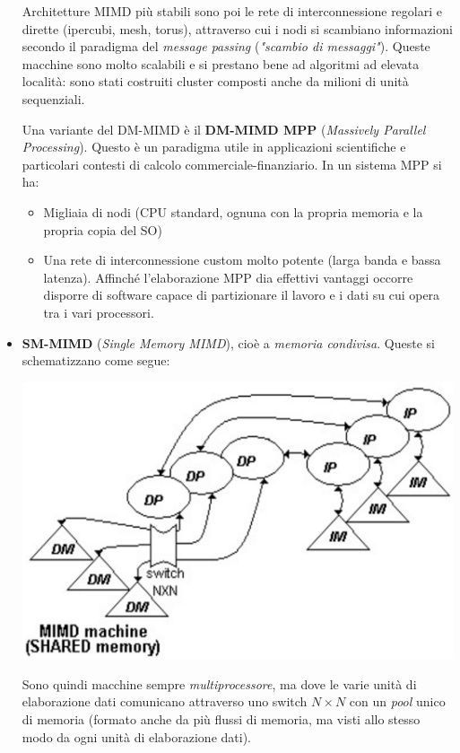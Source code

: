 \documentclass[a4paper,11pt]{article}
\begin{document}
\begin{itemize}
Architetture MIMD più stabili sono poi le rete di interconnessione regolari e dirette (ipercubi, mesh, torus), attraverso cui i nodi si scambiano informazioni secondo il paradigma del \textit{message passing} (\textit{"scambio di messaggi"}). Queste macchine sono molto scalabili e si prestano bene ad algoritmi ad elevata località: sono stati costruiti cluster composti anche da milioni di unità sequenziali.

\par\smallskip

Una variante del DM-MIMD è il \textbf{DM-MIMD MPP} (\textit{Massively Parallel Processing}). Questo è un paradigma utile in applicazioni scientifiche e particolari contesti di calcolo commerciale-finanziario. In un sistema MPP si ha:
\begin{itemize}
	\item Migliaia di nodi (CPU standard, ognuna con la propria memoria e la propria copia del SO)
	\item Una rete di interconnessione custom molto potente (larga banda e bassa latenza). Affinché l’elaborazione MPP dia effettivi vantaggi occorre disporre di software capace di partizionare il lavoro e i dati su cui opera tra i vari processori.
\end{itemize}

\item \textbf{SM-MIMD} (\textit{Single Memory MIMD}), cioè a \textit{memoria condivisa}. Queste si schematizzano come segue:
\begin{center}
	\includegraphics[scale=0.2]{../figures/sm-mimd.png}
\end{center}

Sono quindi macchine sempre \textit{multiprocessore}, ma dove le varie unità di elaborazione dati comunicano attraverso uno switch $N \times N$ con un \textit{pool} unico di memoria (formato anche da più flussi di memoria, ma visti allo stesso modo da ogni unità di elaborazione dati).


\end{itemize}
\end{document}

